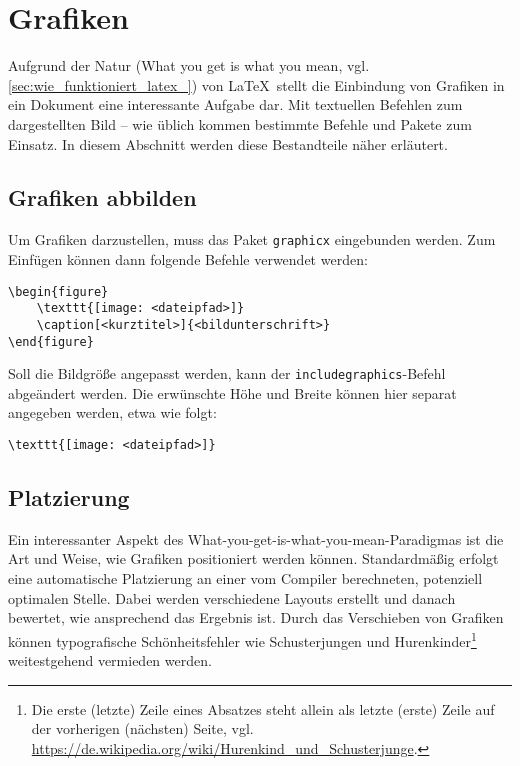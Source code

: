 \section{Grafiken}
\label{sec:grafiken_einbinden}
Aufgrund der Natur (What you get is what you mean, vgl. \cref{sec:wie_funktioniert_latex_}) von \LaTeX \  stellt die Einbindung von Grafiken in ein Dokument eine interessante Aufgabe dar. Mit textuellen Befehlen zum dargestellten Bild -- wie üblich kommen bestimmte Befehle und Pakete zum Einsatz. In diesem Abschnitt werden diese Bestandteile näher erläutert.

\subsection{Grafiken abbilden}
\label{sub:grafiken_abbilden}
Um Grafiken darzustellen, muss das Paket \texttt{graphicx} eingebunden werden. Zum Einfügen können dann folgende Befehle verwendet werden:  

\begin{verbatim}
\begin{figure}
	\texttt{[image: <dateipfad>]}
	\caption[<kurztitel>]{<bildunterschrift>}
\end{figure}
\end{verbatim}

\noindent Soll die Bildgröße angepasst werden, kann der \texttt{includegraphics}-Befehl abgeändert werden. 
Die erwünschte Höhe und Breite können hier separat angegeben werden, etwa wie folgt: 

\begin{verbatim}
\texttt{[image: <dateipfad>]}
\end{verbatim}

\subsection{Platzierung}
\label{sub:platzierung}
Ein interessanter Aspekt des What-you-get-is-what-you-mean-Paradigmas ist die Art und Weise, wie Grafiken positioniert werden können. 
Standardmäßig erfolgt eine automatische Platzierung an einer vom Compiler berechneten, potenziell optimalen Stelle.
Dabei werden verschiedene Layouts erstellt und danach bewertet, wie ansprechend das Ergebnis ist.
Durch das Verschieben von Grafiken können typografische Schönheitsfehler wie Schusterjungen und Hurenkinder\footnote{Die erste (letzte) Zeile eines Absatzes steht allein als letzte (erste) Zeile auf der vorherigen (nächsten) Seite, vgl. \url{https://de.wikipedia.org/wiki/Hurenkind_und_Schusterjunge}.} weitestgehend vermieden werden. 

